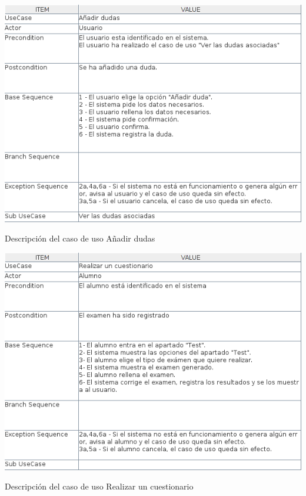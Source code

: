 \documentclass[openright,twoside,10pt]{book}
\begin{document}
    \vspace*{\fill}
    
    \newpage
    
    \vspace*{\fill}
    
    \begin{table}[H]
        \begin{center}
            \includegraphics[width=\textwidth]{img/astah/analisis/casos_de_uso/useCase04.png}
        \end{center}
        \caption{Descripción del caso de uso Añadir dudas}
    \end{table}
    
    \vspace*{\fill}
    
    \newpage
    
    \vspace*{\fill}
    
    \begin{table}[H]
        \begin{center}
            \includegraphics[width=\textwidth]{img/astah/analisis/casos_de_uso/useCase05.png}
        \end{center}
        \caption{Descripción del caso de uso Realizar un cuestionario}
    \end{table}
    
\end{document}
